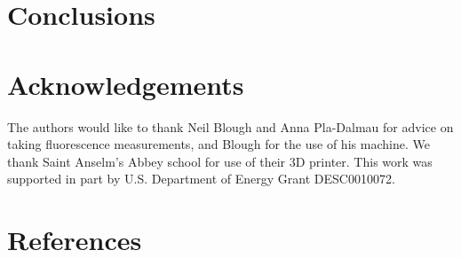 \documentclass[review]{elsarticle}
\begin{document}
\section{Conclusions}

\section{Acknowledgements}
The authors would like to thank Neil Blough and Anna Pla-Dalmau for advice on taking fluorescence measurements, and Blough for the use of his machine. We thank Saint Anselm's Abbey school for use of their 3D printer.   This work was supported in part by U.S. Department of Energy Grant DESC0010072.

\section*{References}


\end{document}
